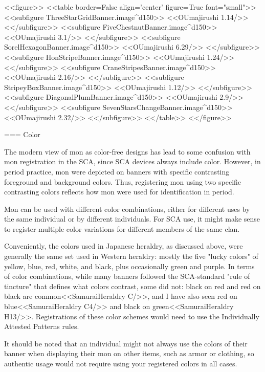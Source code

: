   <<figure>>
  <<table border=False align='center' figure=True font="small">>
  <<subfigure ThreeStarGridBanner.image^d150>>
    \label{3x}<<OUmajirushi 1.14/>>
  <</subfigure>>
  <<subfigure FiveChestnutBanner.image^d150>>
    \label{5x}<<OUmajirushi 3.1/>>
  <</subfigure>>
  <<subfigure SorelHexagonBanner.image^d150>>
    \label{diff}<<OUmajirushi 6.29/>>
  <</subfigure>>
  <<subfigure HonStripeBanner.image^d150>>
    \label{bigstripe}<<OUmajirushi 1.24/>>
  <</subfigure>>
  <<subfigure CraneStripesBanner.image^d150>>
    \label{twostripes}<<OUmajirushi 2.16/>>
  <</subfigure>>
  <<subfigure StripeyBoxBanner.image^d150>>
    \label{manystripes}<<OUmajirushi 1.12/>>
  <</subfigure>>
  <<subfigure DiagonalPlumBanner.image^d150>>
    \label{diagonal}<<OUmajirushi 2.9/>>
  <</subfigure>>
  <<subfigure SevenStarsChangeBanner.image^d150>>
    \label{change}<<OUmajirushi 2.32/>>
  <</subfigure>>
  <</table>>
  <</figure>>

  === Color

  The modern view of mon as color-free designs has lead to some
  confusion with mon registration in the SCA, since SCA devices always
  include color.  However, in period practice, mon were depicted on
  banners with specific contrasting foreground and background colors.
  Thus, registering mon using two specific contrasting colors reflects
  how mon were used for identification in period.

  Mon can be used with different color combinations, either for
  different uses by the same individual or by different individuals.
  For SCA use, it might make sense to register multiple color
  variations for different members of the same clan.

  Conveniently, the colors used in Japanese heraldry, as discussed
  above, were generally the same set used in Western heraldry: mostly
  the five "lucky colors" of yellow, blue, red, white, and black, plus
  occasionally green and purple.  In terms of color combinations,
  while many banners followed the SCA-standard "rule of tincture" that
  defines what colors contrast, some did not: black on red and red on
  black are common<<SamuraiHeraldry C/>>, and I have also seen red on
  blue<<SamuraiHeraldry C4/>> and black on green<<SamuraiHeraldry
  H13/>>.  Registrations of these color schemes would need to use the
  Individually Attested Patterns rules.

  It should be noted that an individual might not always use the
  colors of their banner when displaying their mon on other items,
  such as armor or clothing, so authentic usage would not require
  using your registered colors in all cases.

